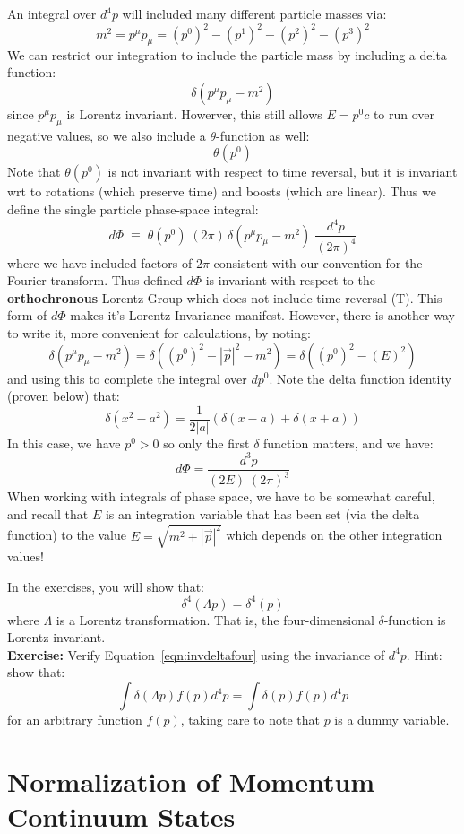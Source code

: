 \documentclass[12pt]{article}
\begin{document}
An integral over $d^4p$ will included many different particle masses
via:
$$m^2 = p^\mu p_\mu = (p^0)^2 - (p^1)^2 - (p^2)^2 - (p^3)^2$$
We can restrict our integration to include the particle mass by including a delta function:
$$\delta(p^\mu p_\mu - m^2)$$
since $p^\mu p_\mu$ is Lorentz invariant.  Howerver, this still allows $E = p^0 c$ to run over negative values, so we
also include a $\theta$-function as well:
$$\theta(p^0)$$
Note that $\theta(p^0)$ is not invariant with respect to time
reversal, but it is invariant wrt to rotations (which preserve time)
and boosts (which are linear).  Thus we define the single particle phase-space integral:
$$d\Phi \; \equiv \; \theta(p^0) \; (2 \pi) \, \delta(p^\mu p_\mu - m^2) \; \frac{d^4p}{(2\pi)^4} $$
where we have included factors of $2\pi$ consistent with our
convention for the Fourier transform.  Thus defined $d\Phi$ is
invariant with respect to the {\bf orthochronous} Lorentz Group which
does not include time-reversal (T).  This form of $d\Phi$ makes it's
Lorentz Invariance manifest.  However, there is another way to write
it, more convenient for calculations, by noting:
$$\delta(p^\mu p_\mu - m^2)
= \delta((p^0)^2 - |\vec{p}|^2 - m^2)
= \delta((p^0)^2 - (E)^2)$$
and using this to complete the integral over $dp^0$.  Note the delta function identity (proven below) that:
$$\delta(x^2 - a^2) = \frac{1}{2|a|} \left( \delta(x-a) + \delta(x+a) \right)$$
In this case, we have $p^0 > 0$ so only the first $\delta$ function matters, and we have:
$$d\Phi = \frac{d^3p}{(2E) \; (2\pi)^3}$$
When working with integrals of phase space, we have to be somewhat careful, and recall that $E$ is an integration variable that has been set (via the delta function) to the value
$E = \sqrt{m^2 + |\vec{p}|^2}$ which depends on the other integration values!

In the exercises, you will show that:
\begin{equation}
\label{eqn:invdeltafour}
\delta^4(\Lambda p) = \delta^4(p)
\end{equation}
where $\Lambda$ is a Lorentz transformation.
That is, the four-dimensional $\delta$-function is Lorentz invariant.\\[4pt]

\noindent
{\bf Exercise:} Verify Equation~\ref{eqn:invdeltafour} using the invariance of $d^4 p$.  Hint: show that:
$$\int \delta (\Lambda p) f(p) d^4 p = \int \delta(p) f(p) d^4 p $$
for an arbitrary function $f(p)$, taking care to note that $p$ is a dummy variable.

\section{Normalization of Momentum Continuum States}
\end{document}
